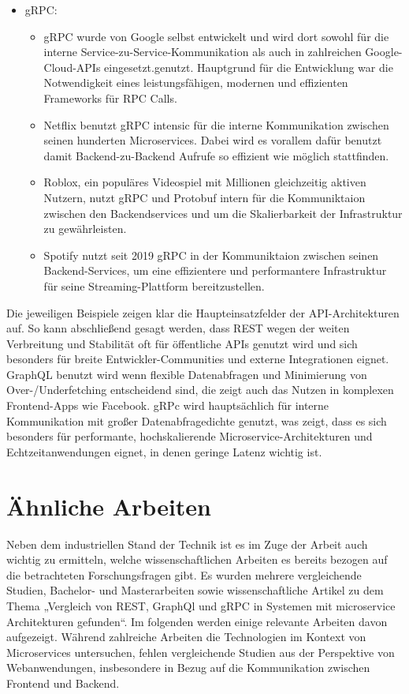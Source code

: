 \begin{itemize}
\begin{itemize}
		\end{itemize}
	\item gRPC:
		\begin{itemize}
			 \item gRPC wurde von Google selbst entwickelt und wird dort sowohl für die interne Service-zu-Service-Kommunikation als auch in zahlreichen Google-Cloud-APIs eingesetzt.genutzt. Hauptgrund für die Entwicklung war die Notwendigkeit eines leistungsfähigen, modernen und effizienten Frameworks für RPC Calls. 
			\item Netflix benutzt gRPC intensic für die interne Kommunikation zwischen seinen hunderten Microservices. Dabei wird es vorallem dafür benutzt damit Backend-zu-Backend Aufrufe so effizient wie möglich stattfinden.
			\item Roblox, ein populäres Videospiel mit Millionen gleichzeitig aktiven Nutzern, nutzt gRPC und Protobuf intern für die Kommuniktaion zwischen den Backendservices und um  die Skalierbarkeit der Infrastruktur zu gewährleisten.
			\item Spotify nutzt seit 2019 gRPC in der Kommuniktaion zwischen seinen Backend-Services,  um eine effizientere und performantere Infrastruktur für seine Streaming-Plattform bereitzustellen.
		\end{itemize}
\end{itemize}

Die jeweiligen Beispiele zeigen klar die Haupteinsatzfelder der API-Architekturen auf. So kann abschließend gesagt werden, dass   REST wegen der weiten Verbreitung und Stabilität oft für öffentliche APIs genutzt wird und sich besonders für breite Entwickler-Communities und externe Integrationen eignet.
GraphQL benutzt wird wenn flexible Datenabfragen und Minimierung von Over-/Underfetching entscheidend sind, die zeigt auch das Nutzen in komplexen Frontend-Apps wie Facebook.
gRPc wird hauptsächlich für interne Kommunikation mit großer Datenabfragedichte genutzt, was zeigt, dass es sich besonders für performante, hochskalierende Microservice-Architekturen und Echtzeitanwendungen eignet, in denen geringe Latenz wichtig ist.


\section{Ähnliche Arbeiten}
Neben dem industriellen Stand der Technik ist es im Zuge der Arbeit auch wichtig zu ermitteln, welche wissenschaftlichen Arbeiten es bereits bezogen auf die betrachteten Forschungsfragen gibt. Es wurden mehrere vergleichende Studien, Bachelor- und Masterarbeiten sowie wissenschaftliche Artikel zu dem Thema „Vergleich von REST, GraphQl und gRPC in Systemen mit microservice Architekturen gefunden“. Im folgenden werden einige relevante Arbeiten davon aufgezeigt. Während zahlreiche Arbeiten die Technologien im Kontext von Microservices untersuchen, fehlen vergleichende Studien aus der Perspektive von Webanwendungen, insbesondere in Bezug auf die Kommunikation zwischen Frontend und Backend.

